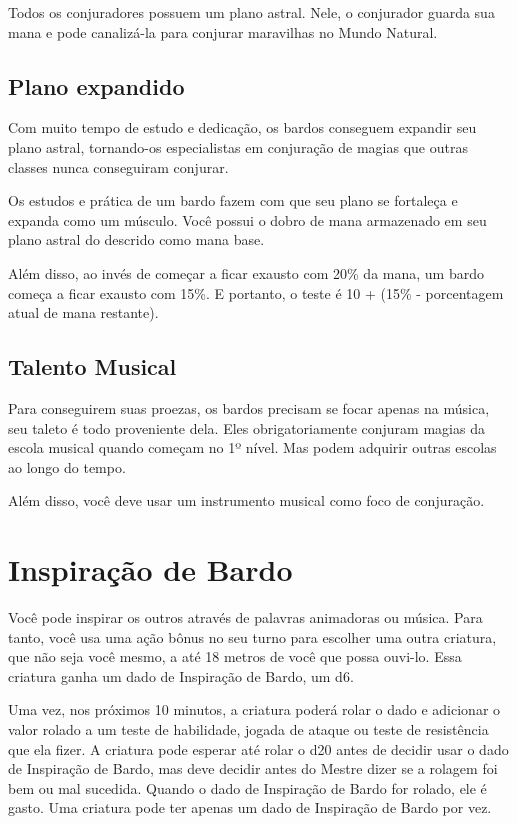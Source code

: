 \documentclass{RPG_Adventure}[2021/10/20]
\begin{document}
\begin{multicols}{2}
Todos os conjuradores possuem um plano astral. Nele, o conjurador guarda sua
mana e pode canalizá-la para conjurar maravilhas no Mundo Natural.

\subsection*{Plano expandido}%

Com muito tempo de estudo e dedicação, os bardos conseguem expandir seu plano
astral, tornando-os especialistas em conjuração de magias que outras classes
nunca conseguiram conjurar.

Os estudos e prática de um bardo fazem com que seu plano se fortaleça e expanda
como um músculo. Você possui o dobro de mana armazenado em seu plano astral do
descrido como mana base.

Além disso, ao invés de começar a ficar exausto com 20\% da mana, um bardo
começa a ficar exausto com 15\%. E portanto, o teste é 10 + (15\% - porcentagem
atual de mana restante).

\subsection*{Talento Musical}%

Para conseguirem suas proezas, os bardos precisam se focar apenas na música, seu
taleto é todo proveniente dela. Eles obrigatoriamente conjuram magias da escola
musical quando começam no 1º nível. Mas podem adquirir outras escolas ao longo
do tempo.

Além disso, você deve usar um instrumento musical como foco de conjuração.

\section*{Inspiração de Bardo}

Você pode inspirar os outros através de palavras animadoras ou música. Para
tanto, você usa uma ação bônus no seu turno para escolher uma outra criatura,
que não seja você mesmo, a até 18 metros de você que possa ouvi-lo. Essa
criatura ganha um dado de Inspiração de Bardo, um d6.

Uma vez, nos próximos 10 minutos, a criatura poderá rolar o dado e adicionar o
valor rolado a um teste de habilidade, jogada de ataque ou teste de resistência
que ela fizer. A criatura pode esperar até rolar o d20 antes de decidir usar o
dado de Inspiração de Bardo, mas deve decidir antes do Mestre dizer se a rolagem
foi bem ou mal sucedida. Quando o dado de Inspiração de Bardo for rolado, ele é
gasto. Uma criatura pode ter apenas um dado de Inspiração de Bardo por vez.


\end{multicols}
\end{document}
